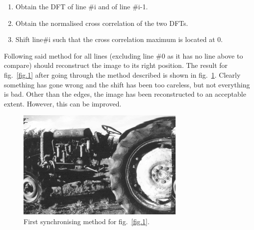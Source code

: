\documentclass[a4paper,12pt]{article}
\begin{document}
\begin{enumerate}
 \item Obtain the DFT of line \#i and of line \#i-1.
 \item Obtain the normalised cross correlation of the two DFTs.
 \item Shift line\#i such that the cross correlation maximum is located at 0.
\end{enumerate}

Following said method for all lines (excluding line \#0 as it has no line above to compare) should reconstruct the image to its right position. The result for fig.~\ref{fig.1} after going through the method described is shown in fig.~\ref{fig.5}. Clearly something has gone wrong and the shift has been too careless, but not everything is bad. Other than the edges, the image has been reconstructed to an acceptable extent. However, this can be improved.

\begin{figure}[h!]
\centering
\includegraphics[width=0.73\textwidth]{img/simple}
\caption{First synchronising method for fig.~\ref{fig.1}.}
\label{fig.5}
\end{figure}

\newpage



\end{document}
